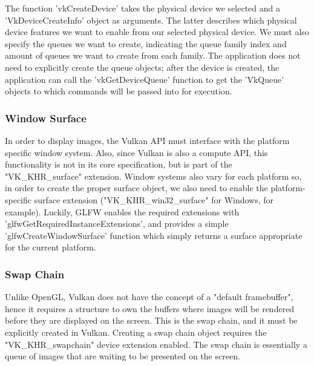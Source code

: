 The function 'vkCreateDevice' takes the physical device we selected and a 'VkDeviceCreateInfo' object as arguments. The latter describes which physical device features we want to enable from our selected physical device. We must also specify the queues we want to create, indicating the queue family index and amount of queues we want to create from each family. The application does not need to explicitly create the queue objects; after the device is created, the application can call the 'vkGetDeviceQueue' function to get the 'VkQueue' objects to which commands will be passed into for execution.

\subsubsection{Window Surface}
In order to display images, the Vulkan API must interface with the platform specific window system. Also, since Vulkan is also a compute API, this functionality is not in its core specification, but is part of the "VK\_KHR\_surface" extension. Window systems also vary for each platform so, in order to create the proper surface object, we also need to enable the platform-specific surface extension ("VK\_KHR\_win32\_surface" for Windows, for example). Luckily, GLFW enables the required extensions with 'glfwGetRequiredInstanceExtensions', and provides a simple 'glfwCreateWindowSurface' function which simply returns a surface appropriate for the current platform.

\subsubsection{Swap Chain}
Unlike OpenGL, Vulkan does not have the concept of a "default framebuffer", hence it requires a structure to own the buffers where images will be rendered before they are displayed on the screen. This is the swap chain, and it must be explicitly created in Vulkan. Creating a swap chain object requires the "VK\_KHR\_swapchain" device extension enabled. The swap chain is essentially a queue of images that are waiting to be presented on the screen.

